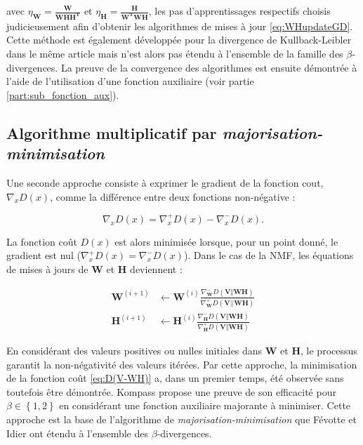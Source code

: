 avec $\eta_{\mathbf{W}} = \frac{\mathbf{W}}{\mathbf{WHH^T}}$ et $\eta_{\mathbf{H}} = \frac{\mathbf{H}}{\mathbf{W^TWH}}$, les pas d'apprentissages respectifs choisis judicieusement afin d'obtenir les algorithmes de mises à jour \ref{eq:WHupdateGD}. Cette méthode est également développée pour la divergence de Kullback-Leibler dans le même article mais n'est alors pas étendu à l'ensemble de la famille des $\beta$-divergences. La preuve de la convergence des algorithmes est ensuite démontrée à l'aide de l'utilisation d'une fonction auxiliaire (voir partie \ref{part:sub_fonction_aux}).


\subsection{Algorithme multiplicatif par \textit{majorisation-minimisation}}\label{part:majorisation-minimisation}
Une seconde approche \cite{cichocki2006csiszar} consiste à exprimer le gradient de la fonction cout, $\nabla_x D(x)$, comme la différence entre deux fonctions non-négative :

\begin{equation}
\nabla_x D(x) = \nabla_x^+ D(x) - \nabla_x^- D(x).
\end{equation}

La fonction coût $D(x)$ est alors minimisée lorsque, pour un point donné, le gradient est nul ($\nabla_x^+ D(x) = \nabla_x^- D(x)$). Dans le cas de la NMF, les équations de mises à jours de $\mathbf{W}$ et $\mathbf{H}$ deviennent :

\begin{subequations}
    \begin{align}
     \mathbf{W}^{(i+1)} & \leftarrow \mathbf{W}^{(i)}\frac{\nabla_\mathbf{W}^-D(\mathbf{V}\Vert\mathbf{WH})}{\nabla_\mathbf{W}^+D(\mathbf{V}\vert \vert \mathbf{WH})}\\
     \mathbf{H}^{(i+1)} & \leftarrow \mathbf{H}^{(i)}\frac{\nabla_\mathbf{H}^-D(\mathbf{V}\Vert\mathbf{WH})}{\nabla_\mathbf{H}^+D(\mathbf{V}\Vert\mathbf{WH})}
    \end{align}
\end{subequations}

En considérant des valeurs positives ou nulles initiales dans $\mathbf{W}$ et $\mathbf{H}$, le processus garantit la non-négativité des valeurs itérées. Par cette approche, la minimisation de la fonction coût \ref{eq:D(V-WH)} a, dans un premier temps, été observée sans toutefois être démontrée. Kompass \cite{kompass_generalized_2007} propose une preuve de son efficacité pour $\beta \in \left\lbrace1,2 \right\rbrace$ en considérant une fonction auxiliaire majorante à minimiser. Cette approche est la base de l'algorithme de \textit{majorisation-minimisation} que Févotte et Idier \cite{fevotte_algorithms_2011} ont étendu à l'ensemble des $\beta$-divergences.

